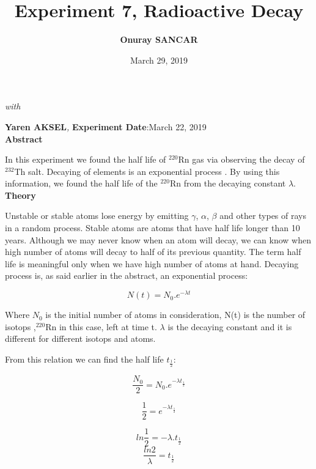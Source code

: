 \documentclass[10pt,a4paper]{article}
\begin{document}
	\author{\textbf{Onuray SANCAR}}
	\title{\textbf{Experiment 7, Radioactive Decay}}
	\date{March 29, 2019}
	\maketitle
	\textit{with} {\large\textbf{{Yaren AKSEL}}\textit{,} \textbf{Experiment Date}:March 22, 2019\\[3\baselineskip]
		\textbf{Abstract}\\[\baselineskip]
		\par In this experiment we found the half life of $^{220}$Rn gas via observing the decay of $^{232}$Th salt. Decaying of elements is an exponential process . By using this information, we found the half life of the $^{220}$Rn from the decaying constant $\lambda$.
		\\[\baselineskip]
		\textbf{Theory}\\[\baselineskip]
		\par Unstable or stable atoms lose energy by emitting $\gamma$, $\alpha$, $\beta$ and other types of rays in a random process. Stable atoms are atoms that have half life longer than 10 years. Although we may never know when an atom will decay, we can know when high number of atoms will decay to half of its previous quantity. The term half life is meaningful only when we have high number of atoms at hand. 
		Decaying process is, as said earlier in the abstract, an exponential process:
		\begin{center}
		\begin{equation}
		N(t)=N_{0}.e^{-{\lambda}t}
		\end{equation} 
		\end{center} 
	\par Where $N_0$ is the initial number of atoms in consideration, N(t) is the number of isotops ,$^{220}$Rn in this case, left at time t. $\lambda$ is the decaying constant and it is different for different isotops and atoms.
	\newpage
	\par From this relation we can find the half life $t_{\frac{1}{2}}$:
		
		\begin{equation}
		\frac{N_0}{2}=N_{0}.e^{-{\lambda}t_{\frac{1}{2}}}
		\end{equation} 


		\begin{equation}
	\frac{1}{2}=e^{-{\lambda}t_{\frac{1}{2}}}
	\end{equation} 
\begin{center}
\begin{equation}
ln\frac{1}{2}=-\lambda.t_{\frac{1}{2}}
\end{equation} 
 \begin{equation}
 \frac{ln2}{\lambda}=t_{\frac{1}{2}}
 \end{equation}
\end{center}

}
\end{document}
